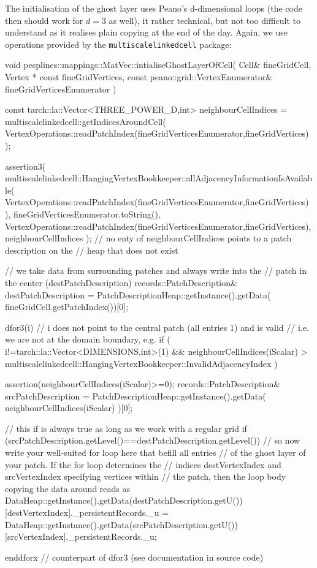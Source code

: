 The initialisation of the ghost layer uses Peano's d-dimensional loops (the
code then should work for $d=3$ as well), it rather technical, but not too
difficult to understand as it realises plain copying at the end of the day.
Again, we use operations provided by the \texttt{multiscalelinkedcell} package:

\begin{code}
void pesplines::mappings::MatVec::intialiseGhostLayerOfCell(
 Cell&                                 fineGridCell,
 Vertex * const                        fineGridVertices,
 const peano::grid::VertexEnumerator&  fineGridVerticesEnumerator
) {
 const tarch::la::Vector<THREE_POWER_D,int> neighbourCellIndices = 
  multiscalelinkedcell::getIndicesAroundCell(
   VertexOperations::readPatchIndex(fineGridVerticesEnumerator,fineGridVertices)
 );

 assertion3(
   multiscalelinkedcell::HangingVertexBookkeeper::allAdjacencyInformationIsAvailable(
    VertexOperations::readPatchIndex(fineGridVerticesEnumerator,fineGridVertices)
   ),
   fineGridVerticesEnumerator.toString(),
   VertexOperations::readPatchIndex(fineGridVerticesEnumerator,fineGridVertices),
   neighbourCellIndices
 ); // no enty of neighbourCellIndices points to a patch description on the
    // heap that does not exist
 
 // we take data from surrounding patches and always write into the
 // patch in the center (destPatchDescription)
 records::PatchDescription& destPatchDescription = 
  PatchDescriptionHeap::getInstance().getData( fineGridCell.getPatchIndex())[0];

 dfor3(i)
  // i does not point to the central patch (all entries 1) and is valid
  // i.e. we are not at the domain boundary, e.g.
  if (
   i!=tarch::la::Vector<DIMENSIONS,int>(1) &&
   neighbourCellIndices(iScalar) > 
    multiscalelinkedcell::HangingVertexBookkeeper::InvalidAdjacencyIndex
  ) {
   assertion(neighbourCellIndices(iScalar)>=0);
   records::PatchDescription& srcPatchDescription 
    = PatchDescriptionHeap::getInstance().getData( neighbourCellIndices(iScalar) )[0];
 
   // this if is always true as long as we work with a regular grid
   if (srcPatchDescription.getLevel()==destPatchDescription.getLevel()) {
    // so now write your well-suited for loop here that befill all entries 
    // of the ghost layer of your patch. If the for loop determines the 
    // indices destVertexIndex and srcVertexIndex specifying vertices within 
    // the patch, then the loop body copying the data around reads as 
    DataHeap::getInstance().getData(destPatchDescription.getU())
      [destVertexIndex]._persistentRecords._u =
     DataHeap::getInstance().getData(srcPatchDescription.getU())
      [srcVertexIndex]._persistentRecords._u;
   }
  }
 enddforx // counterpart of dfor3 (see documentation in source code)
}
\end{code}

